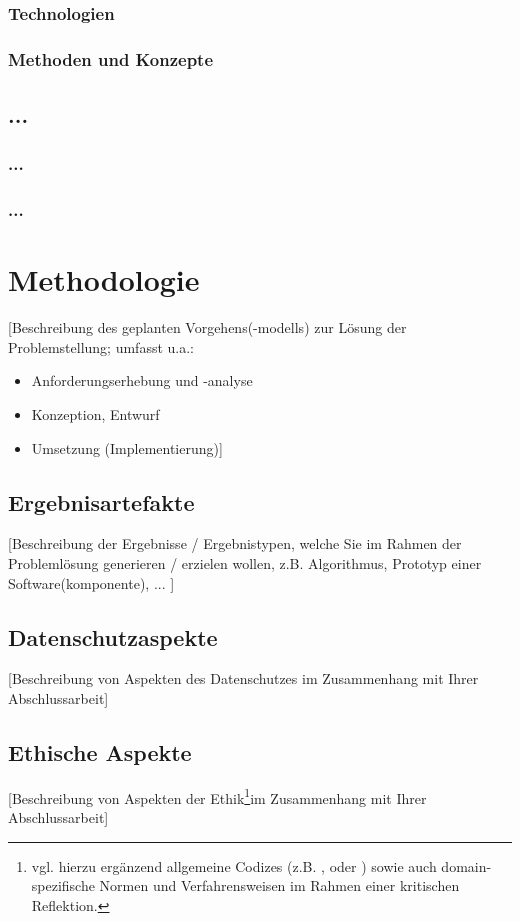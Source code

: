 \documentclass[oneside,bibliography=totocnumbered,BCOR=5mm]{scrbook}
\begin{document}
\subsection{Technologien}


\subsection{Methoden und Konzepte}


\section{...}


\subsection{...}


\subsection{...}

\chapter{Methodologie}

[Beschreibung des geplanten Vorgehens(-modells) zur L\"osung der Problemstellung; umfasst u.a.:
\begin{itemize}
\item Anforderungserhebung und -analyse
\item Konzeption, Entwurf
\item Umsetzung (Implementierung)]
\end{itemize}

\section{Ergebnisartefakte}
[Beschreibung der Ergebnisse / Ergebnistypen, welche Sie im Rahmen der Probleml\"osung generieren / erzielen wollen, z.B. Algorithmus, Prototyp einer Software(komponente), ... ]

\section{Datenschutzaspekte}
[Beschreibung von Aspekten des Datenschutzes im Zusammenhang mit Ihrer Abschlussarbeit]

\section{Ethische Aspekte}
[Beschreibung von Aspekten der Ethik\footnote{vgl. hierzu erg\"anzend allgemeine Codizes (z.B. \autocite{acm}, \autocite{ieee} oder \autocite{gi}) sowie auch domain-spezifische Normen und Verfahrensweisen im Rahmen einer kritischen Reflektion.}im Zusammenhang mit Ihrer Abschlussarbeit]
\end{document}
